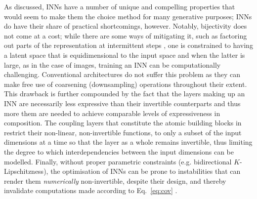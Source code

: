 %
As discussed, \acp{INN} have a number of unique and compelling properties that would seem to make them
the choice method for many generative purposes; \acp{INN} do have their share of practical
shortcomings, however. 
%
Notably, bijectivity does not come at a cost; while there are some ways of mitigating it, such as
factoring out parts of the representation at intermittent steps \citep{hoogeboom2019integer}, one
is constrained to having a latent space that is equidimensional to the input space and when the
latter is large, as in the case of images, training an \ac{INN} can be computationally challenging.
%
Conventional architectures do not suffer this problem as they can make free use of coarsening
(downsampling) operations throughout their extent.
%
This drawback is further compounded by the fact that the layers making up an \ac{INN} are necessarily
less expressive than their invertible counterparts and thus more them are needed to achieve
comparable levels of expressiveness in composition. 
%
The coupling layers that constitute the atomic building blocks in \citet{dinh2014nice} restrict
their non-linear, non-invertible functions, to only a subset of the input dimensions at a time so
that the layer as a whole remains invertible, thus limiting the degree to which interdependencies
between the input dimensions can be modelled.
%
Finally, without proper parametric constraints (e.g. bidirectional \(K\)-Lipschitzness), the
optimisation of \acp{INN} can be prone to instabilities that can render them \emph{numerically}
non-invertible, despite their design, and thereby invalidate computations made according to
Eq.~\ref{eq:cov} \citep{behrmann2021understanding}.
